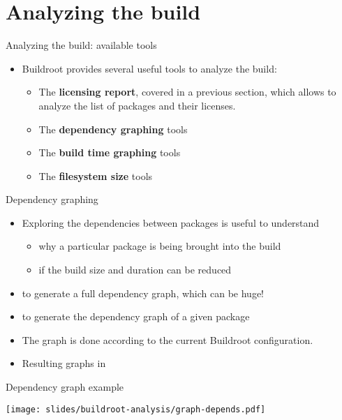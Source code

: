 
\section{Analyzing the build}

\begin{frame}{Analyzing the build: available tools}
  \begin{itemize}
  \item Buildroot provides several useful tools to analyze the build:
    \begin{itemize}
    \item The {\bf licensing report}, covered in a previous section,
      which allows to analyze the list of packages and their licenses.
    \item The {\bf dependency graphing} tools
    \item The {\bf build time graphing} tools
    \item The {\bf filesystem size} tools
    \end{itemize}
  \end{itemize}
\end{frame}

\begin{frame}{Dependency graphing}
  \begin{itemize}
  \item Exploring the dependencies between packages is useful to
    understand
    \begin{itemize}
    \item why a particular package is being brought into the
      build
    \item if the build size and duration can be reduced
    \end{itemize}
  \item {} to generate a full dependency graph,
    which can be huge!
  \item {} to generate the dependency
    graph of a given package
  \item The graph is done according to the current Buildroot
    configuration.
  \item Resulting graphs in 
  \end{itemize}
\end{frame}

\begin{frame}{Dependency graph example}
  \begin{center}
    \texttt{[image: slides/buildroot-analysis/graph-depends.pdf]}
  \end{center}
\end{frame}

